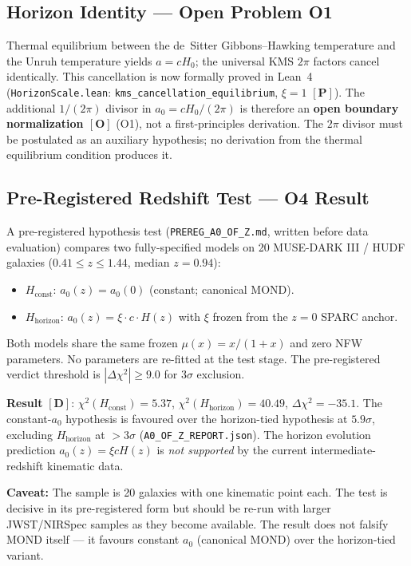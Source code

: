 \documentclass[aps,prd,preprint,superscriptaddress,nofootinbib,amsmath,amssymb,floatfix]{revtex4-2}
\begin{document}
\subsection{Horizon Identity --- Open Problem O1}

Thermal equilibrium between the de~Sitter Gibbons--Hawking temperature \cite{GibbonsHawking1977} and the Unruh temperature \cite{Unruh1976} yields $a = cH_0$; the universal KMS $2\pi$ factors cancel identically. This cancellation is now formally proved in Lean~4 (\texttt{HorizonScale.lean}: \texttt{kms\_cancellation\_equilibrium}, $\xi = 1$ $\mathbf{[P]}$). The additional $1/(2\pi)$ divisor in $a_0 = cH_0/(2\pi)$ is therefore an \textbf{open boundary normalization $\mathbf{[O]}$} (O1), not a first-principles derivation. The $2\pi$ divisor must be postulated as an auxiliary hypothesis; no derivation from the thermal equilibrium condition produces it.

\subsection{Pre-Registered Redshift Test --- O4 Result}

A pre-registered hypothesis test (\texttt{PREREG\_A0\_OF\_Z.md}, written before data evaluation) compares two fully-specified models on 20 MUSE-DARK III / HUDF galaxies ($0.41 \le z \le 1.44$, median $z = 0.94$):
\begin{itemize}
    \item $H_{\text{const}}$: $a_0(z) = a_0(0)$ (constant; canonical MOND).
    \item $H_{\text{horizon}}$: $a_0(z) = \xi \cdot c \cdot H(z)$ with $\xi$ frozen from the $z=0$ SPARC anchor.
\end{itemize}
Both models share the same frozen $\mu(x) = x/(1+x)$ and zero NFW parameters. No parameters are re-fitted at the test stage. The pre-registered verdict threshold is $|\Delta\chi^2| \ge 9.0$ for $3\sigma$ exclusion.

\textbf{Result} $\mathbf{[D]}$: $\chi^2(H_{\text{const}}) = 5.37$, $\chi^2(H_{\text{horizon}}) = 40.49$, $\Delta\chi^2 = -35.1$. The constant-$a_0$ hypothesis is favoured over the horizon-tied hypothesis at $5.9\sigma$, excluding $H_{\text{horizon}}$ at $> 3\sigma$ (\texttt{A0\_OF\_Z\_REPORT.json}). The horizon evolution prediction $a_0(z) = \xi c H(z)$ is \emph{not supported} by the current intermediate-redshift kinematic data.

\textbf{Caveat:} The sample is 20 galaxies with one kinematic point each. The test is decisive in its pre-registered form but should be re-run with larger JWST/NIRSpec samples as they become available. The result does not falsify MOND itself --- it favours constant $a_0$ (canonical MOND) over the horizon-tied variant.
\end{document}

